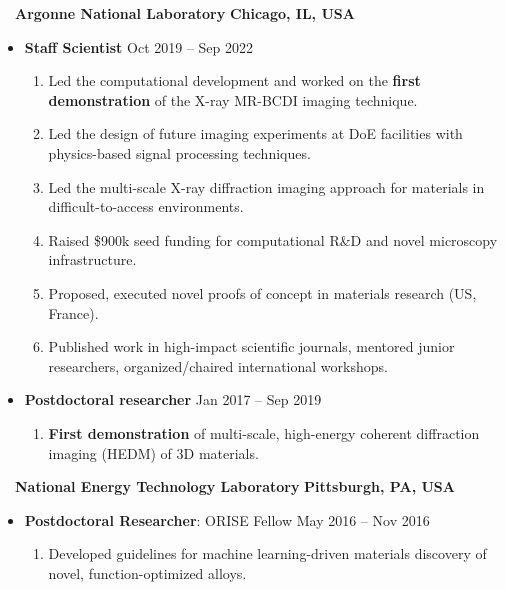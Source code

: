 \documentclass[10.5pt]{article}
\begin{document}
~~{\color{black}\textbf{Argonne National Laboratory} \hfill  \textbf{Chicago, IL, USA}}\par
\begin{itemize}
    \item
        \textbf{Staff Scientist}
        \hfill  {Oct 2019 -- Sep 2022} \par
        \begin{enumerate}
            \item Led the computational development and worked on the \textbf{first demonstration} of the X-ray MR-BCDI imaging technique.
            \item Led the design of future imaging experiments at DoE facilities with physics-based signal processing techniques.
            \item Led the multi-scale X-ray diffraction imaging approach for materials in difficult-to-access environments.
            \item Raised \$900k seed funding for computational R\&D and novel microscopy infrastructure. 
            \item Proposed, executed novel proofs of concept in materials research (US, France).
            \item Published work in high-impact scientific journals, mentored junior researchers, organized/chaired international workshops.
        \end{enumerate}
    \item
        \textbf{Postdoctoral researcher}
        \hfill  {Jan 2017 -- Sep 2019} \par
        \begin{enumerate}
            \item \textbf{First demonstration} of multi-scale, high-energy coherent diffraction imaging (HEDM) of 3D materials.
        \end{enumerate}
\end{itemize} 

~~{\color{black}\textbf{National Energy Technology Laboratory} \hfill  \textbf{Pittsburgh, PA, USA}}\par
\begin{itemize}
    \item
        \textbf{Postdoctoral Researcher}: ORISE Fellow
        \hfill  {May 2016 -- Nov 2016} \par
        \begin{enumerate}
            \item Developed guidelines for machine learning-driven materials discovery of novel, function-optimized alloys.
        \end{enumerate}
\end{itemize} 
\end{document}
